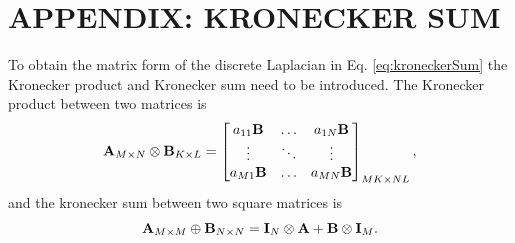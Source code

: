 \documentclass[fleqn]{jaes}
\begin{document}
\appendix
\section*{APPENDIX: KRONECKER SUM}\label{app:kronecker}
To obtain the matrix form of the discrete Laplacian in Eq. \eqref{eq:kroneckerSum} the Kronecker product and Kronecker sum need to be introduced. The Kronecker product between two matrices is \cite{Horn1991}
\begin{equation}
    \mathbf{A}_{M\times N} \otimes \mathbf{B}_{K\times L} = \begin{bmatrix}
        a_{11}\mathbf{B} & \hdots & a_{1N}\mathbf{B}\\
        \vdots & \ddots & \vdots\\
        a_{M1}\mathbf{B} & \hdots & a_{MN}\mathbf{B}\\
    \end{bmatrix}_{MK \times NL},
\end{equation}
and the kronecker sum between two square matrices is \cite{Hamilton2016}
\begin{equation}\label{eq:kronSum}
    \A_{M \times M} \oplus \B_{N \times N} = \I_N\otimes \A + \B \otimes\I_M.
\end{equation}
\end{document}
